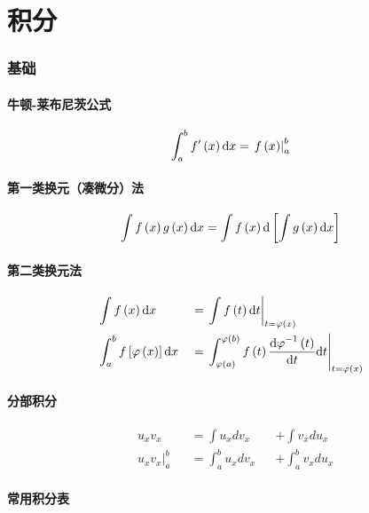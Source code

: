 \documentclass{article}
\begin{document}
\part{积分}

\section{基础}

\subsection{牛顿-莱布尼茨公式}

\[\int_a^b{f^\prime\left(x\right)\mathrm d x}=\left.f\left(x\right)\right|_a^b\]

\subsection{第一类换元（凑微分）法}

\[\int f\left(x\right)g\left(x\right)\mathrm d x=\int f\left(x\right)\mathrm d\left[\int g\left(x\right)\mathrm d x\right]\]

\subsection{第二类换元法}

\[\begin{aligned}
         & \int f\left(x\right)\mathrm d x                        &  & =\left.\int f\left(t\right)\mathrm d t\right|_{t=\varphi\left(x\right)}                                                                         \\
         & \int_a^bf\left[\varphi\left(x\right)\right]\mathrm d x &  & =\left.\int_{\varphi\left(a\right)}^{\varphi\left(b\right)}{f\left(t\right)\frac{{\mathrm d\varphi}^{-1}\left(t\right)}{ \mathrm d t}\mathrm d t}\right|_{t=\varphi\left(x\right)}
    \end{aligned}\]

\subsection{分部积分}

\[\begin{aligned}
         & u_xv_x                  &  & =\int{u_xdv_x}     &  & +\int{v_xdu_x}     \\
         & \left.u_xv_x\right|_a^b &  & =\int_a^b{u_xdv_x} &  & +\int_a^b{v_xdu_x}\end{aligned}\]

\subsection{常用积分表}
\end{document}
